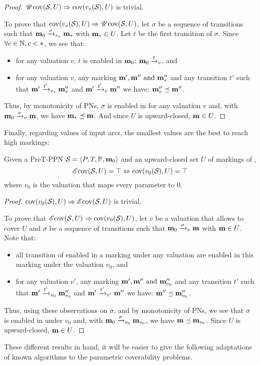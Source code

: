 \begin{proof}
  $\UcovOp(\namePPN, U) \Rightarrow \cov{v_*(\namePPN)}{U}$ is trivial.

  To prove that $\cov{v_*(\namePPN)}{U} \Rightarrow \UcovOp(\namePPN, U)$, let $\sigma$ be a sequence of transitions such that $\mari \fire[v_*]{\sigma} \mar_*$ with $\mar_* \in U$.
  Let $t$ be the first transition of $\sigma$.
  Since $\forall c \in \naturals, c < *$, we see that:
  \begin{itemize}
    \item for any valuation $v$, $t$ is enabled in $\mari$: $\mari \fire[v]{t}$, and
    \item for any valuation $v$, any marking $\mar', \mar'' \text{ and } \mar''_*$ and any transition $t'$ such that $\mar' \fire[v_*]{t'} \mar''_*$ and $\mar' \fire[v]{t'} \mar''$ we have: $\mar''_* \preceq \mar''$.
  \end{itemize}

  Thus, by monotonicity of \acp{PN}, $\sigma$ is enabled in \mari for any valuation $v$ and, with $\mari \fire[v]{\sigma} \mar$, we have $\mar_* \preceq \mar$.
  And since $U$ is upward-closed, $\mar \in U$.
\end{proof}

Finally, regarding values of input arcs, the smallest values are the best to reach high markings:

\begin{theo}
  \label{theo:pre-e-zero-val}
  Given a PreT-\ac{PPN} $\defPPN$ and an upward-closed set $U$ of markings of \namePPN, \[\EcovOp(\namePPN, U) = \top \Leftrightarrow \cov{v_0(\namePPN)}{U} = \top\] where $v_0$ is the valuation that maps every parameter to $0$.
\end{theo}

\begin{proof}
  $\cov{v_0(\namePPN)}{U} \Rightarrow \EcovOp(\namePPN, U)$ is trivial.

  To prove that $\EcovOp(\namePPN, U) \Rightarrow \cov{v_0(\namePPN)}{U}$, let $v$ be a valuation that allows to cover $U$ and $\sigma$ be a sequence of transitions such that $\mari \fire[v]{\sigma} \mar$ with $\mar \in U$.
  Note that:
  \begin{itemize}
    \item all transition of \namePPN enabled in a marking under any valuation are enabled in this marking under the valuation $v_0$, and
    \item for any valuation $v'$, any marking $\mar', \mar'' \text{ and } \mar''_{v_0}$ and any transition $t'$ such that $\mar' \fire[{v_0}]{t'} \mar''_{v_0}$ and $\mar' \fire[{v'}]{t'} \mar''$ we have: $\mar'' \preceq \mar''_{v_0}$.
  \end{itemize}

  Thus, using these observations on $\sigma$, and by monotonicity of \acp{PN}, we see that $\sigma$ is enabled in \mari under $v_0$ and, with $\mari \fire[{v_0}]{\sigma} \mar_{v_0}$, we have $\mar \preceq \mar_{v_0}$.
  Since $U$ is upward-closed, $\mar \in U$.
\end{proof}

These different results in hand, it will be easier to give the following adaptations of known algorithms to the parametric coverability problems.
